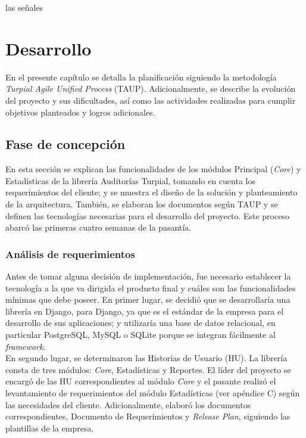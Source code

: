 las señales\chapter{\textbf{Desarrollo}}

\thispagestyle{empty}

En el presente capítulo se detalla la planificación siguiendo la metodología \textit{Turpial Agile Unified Process} (TAUP). Adicionalmente, se describe la evolución del proyecto y sus dificultades, así como las actividades realizadas para cumplir objetivos planteados y logros adicionales.

\section{Fase de concepción}

En esta sección se explican las funcionalidades de los módulos Principal (\textit{Core}) y Estadísticas de la librería Auditorías Turpial, tomando en cuenta los requerimientos del cliente; y se muestra el diseño de la solución y planteamiento de la arquitectura. También, se elaboran los documentos según TAUP y se definen las tecnologías necesarias para el desarrollo del proyecto. Este proceso abarcó las primeras cuatro semanas de la pasantía.

\subsection{Análisis de requerimientos}

Antes de tomar alguna decisión de implementación, fue necesario establecer la tecnología a la que va dirigida el producto final y cuáles son las funcionalidades mínimas que debe poseer. En primer lugar, se decidió que se desarrollaría una librería en Django, para Django, ya que es el estándar de la empresa para el desarrollo de sus aplicaciones; y utilizaría una base de datos relacional, en particular PostgreSQL, MySQL o SQLite porque se integran fácilmente al \textit{framework}. \\

En segundo lugar, se determinaron las Historias de Usuario (HU). La librería consta de tres módulos: \textit{Core}, Estadísticas y Reportes. El líder del proyecto se encargó de las HU correspondientes al módulo \textit{Core} y el pasante realizó el levantamiento de requerimientos del módulo Estadísticas (ver apéndice C) según las necesidades del cliente. Adicionalmente, elaboró los documentos correspondientes, Documento de Requerimientos y \textit{Release Plan}, siguiendo las plantillas de la empresa. \\

